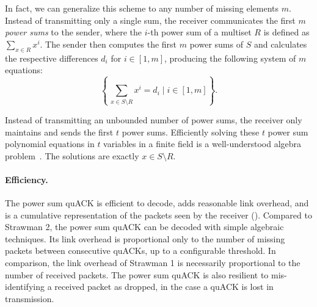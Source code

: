In fact, we can generalize this scheme to any number of missing elements $m$.
Instead of transmitting only a single sum, the receiver communicates
the first $m$ \emph{power sums} to the sender, where the $i$-th power sum of a
multiset $R$ is defined as $\sum_{x \in R} x^i$.
The sender then computes the first $m$ power sums of $S$ and calculates the
respective differences $d_i$ for $i \in [1,m]$, producing the following
system of $m$ equations:
\vspace{-0.2cm}
\[
    \left\{\, \sum_{x \in S\setminus R} x^i = d_i \mid i \in [1,m] \right\}.
\]
\vspace{-0.4cm}

Instead of transmitting an unbounded number of power sums, the receiver only
maintains and sends the first $t$ power sums.
Efficiently solving these $t$ power sum polynomial equations in $t$ variables
in a finite field is a well-understood algebra problem~\cite{eppstein2011straggler}. The
solutions
are exactly $x \in S \setminus R$.

\paragraph{Efficiency.}
The power sum quACK is efficient to decode, adds reasonable link overhead,
and is a cumulative representation of the packets seen by the receiver
().
Compared to Strawman 2, the power sum quACK can be decoded with simple
algebraic techniques.
Its link overhead is proportional only to the number of
missing packets between consecutive quACKs, up to a configurable threshold. In
comparison, the link overhead of Strawman 1 is necessarily proportional to the
number of received packets.
The power sum quACK is also resilient to mis-identifying a received packet as
dropped, in the case a quACK is lost in transmission.

